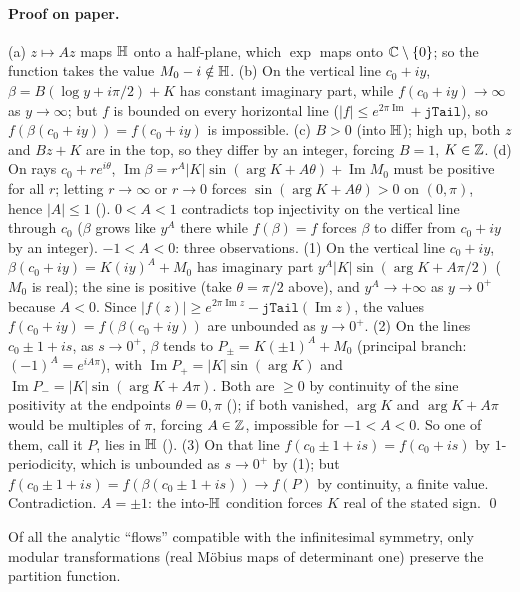\paragraph{Proof on paper.}  (a) $z\mapsto Az$ maps $\mathbb{H}$ onto a half-plane, which $\exp$ maps onto ${\mathbb{C}}\setminus\{0\}$; so the function takes
the value $M_0-i\notin\mathbb{H}$.  (b) On the vertical line $c_0+iy$, $\beta=B(\log y+i\pi/2)+K$ has constant imaginary part, while
$f(c_0+iy)\to\infty$ as $y\to\infty$; but $f$ is bounded on every horizontal line ($|f|\le e^{2\pi\operatorname{Im}}+\mathtt{jTail}$), so
$f(\beta(c_0+iy))=f(c_0+iy)$ is impossible.  (c) $B>0$ (into $\mathbb{H}$); high up, both $z$ and $Bz+K$ are in the top, so they differ by an
integer, forcing $B=1$, $K\in{\mathbb{Z}}$.  (d) On rays $c_0+re^{i\theta}$, $\operatorname{Im}\beta=r^A|K|\sin(\arg K+A\theta)+\operatorname{Im}M_0$ must be positive
for all $r$; letting $r\to\infty$ or $r\to0$ forces $\sin(\arg K+A\theta)>0$ on $(0,\pi)$, hence $|A|\le1$ ().
$0<A<1$ contradicts top injectivity on the vertical line through $c_0$ ($\beta$ grows like $y^A$ there while $f(\beta)=f$ forces $\beta$ to differ
from $c_0+iy$ by an integer).  $-1<A<0$: three observations.  (1) On the vertical line $c_0+iy$, $\beta(c_0+iy)=K(iy)^A+M_0$ has imaginary part
$y^A|K|\sin(\arg K+A\pi/2)$ ($M_0$ is real); the sine is positive (take $\theta=\pi/2$ above), and $y^A\to+\infty$ as $y\to0^+$ because
$A<0$.  Since $|f(z)|\ge e^{2\pi\operatorname{Im}z}-\mathtt{jTail}(\operatorname{Im}z)$, the values $f(c_0+iy)=f(\beta(c_0+iy))$ are unbounded
as $y\to0^+$.  (2) On the lines $c_0\pm1+is$, as $s\to0^+$, $\beta$ tends to $P_\pm=K(\pm1)^A+M_0$ (principal branch: $(-1)^A=e^{iA\pi}$),
with $\operatorname{Im}P_+=|K|\sin(\arg K)$ and $\operatorname{Im}P_-=|K|\sin(\arg K+A\pi)$.  Both are $\ge0$ by continuity of the sine
positivity at the endpoints $\theta=0,\pi$ (); if both vanished, $\arg K$ and $\arg K+A\pi$ would be multiples of
$\pi$, forcing $A\in{\mathbb{Z}}$, impossible for $-1<A<0$.  So one of them, call it $P$, lies in $\mathbb{H}$ ().
(3) On that line $f(c_0\pm1+is)=f(c_0+is)$ by $1$-periodicity, which is unbounded as $s\to0^+$ by (1); but
$f(c_0\pm1+is)=f(\beta(c_0\pm1+is))\to f(P)$ by continuity, a finite value.  Contradiction.  $A=\pm1$: the into-$\mathbb{H}$ condition forces $K$ real of the stated sign. \qed
\begin{physics}Of all the analytic ``flows'' compatible with the infinitesimal symmetry, only modular transformations (real
M\"obius maps of determinant one) preserve the partition function.\end{physics}
